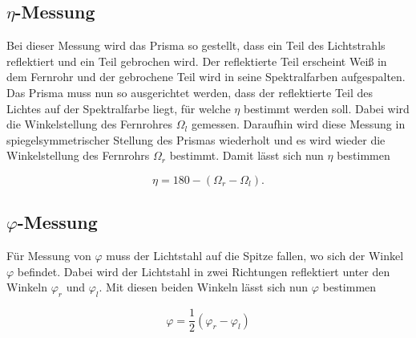 \subsection{\texorpdfstring{$\eta$} --Messung}

Bei dieser Messung wird das Prisma so gestellt, dass ein Teil des Lichtstrahls
reflektiert und ein Teil gebrochen wird. Der reflektierte Teil erscheint Weiß
in dem Fernrohr und der gebrochene Teil wird in seine Spektralfarben aufgespalten.
Das Prisma muss nun so ausgerichtet werden, dass der reflektierte Teil des Lichtes
auf der Spektralfarbe liegt, für welche $\eta$ bestimmt werden soll. Dabei wird die
Winkelstellung des Fernrohres $\Omega_l$ gemessen. Daraufhin wird diese Messung in
spiegelsymmetrischer Stellung des Prismas wiederholt und es wird wieder die Winkelstellung
des Fernrohrs $\Omega_r$ bestimmt. Damit lässt sich nun $\eta$ bestimmen

\begin{equation}
  \eta = 180 - (\Omega_r - \Omega_l).
  \label{eq:6}
\end{equation}

\subsection{\texorpdfstring{$\varphi$} --Messung}

Für Messung von $\varphi$ muss der Lichtstahl auf die Spitze fallen, wo sich der Winkel
$\varphi$ befindet. Dabei wird der Lichtstahl in zwei Richtungen reflektiert unter den
Winkeln $\varphi_r$ und $\varphi_l$. Mit diesen beiden Winkeln lässt sich nun $\varphi$ bestimmen

\begin{equation}
  \varphi = \frac{1}{2}(\varphi_r - \varphi_l)
  \label{eq:7}
\end{equation}
